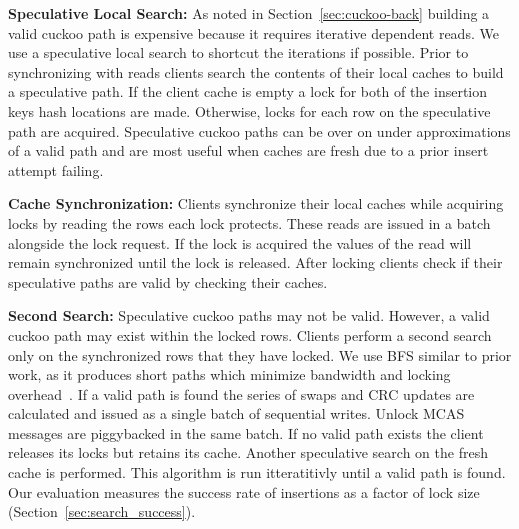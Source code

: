 \textbf{Speculative Local Search:} As noted in
Section~\ref{sec:cuckoo-back} building a valid cuckoo path
is expensive because it requires iterative dependent reads.
We use a speculative local search to shortcut the iterations
if possible. Prior to synchronizing with reads clients
search the contents of their local caches to build a
speculative path. If the client cache is empty a lock for
both of the insertion keys hash locations are made.
Otherwise, locks for each row on the speculative path are
acquired. Speculative cuckoo paths can be over on under
approximations of a valid path and are most useful when
caches are fresh due to a prior insert attempt failing.


\textbf{Cache Synchronization:} Clients synchronize their
local caches while acquiring locks by reading the rows each
lock protects. These reads are issued in a batch alongside
the lock request. If the lock is acquired the values of the
read will remain synchronized until the lock is released.
After locking clients check if their speculative paths are
valid by checking their caches.


\textbf{Second Search:} Speculative cuckoo paths may not be
valid. However, a valid cuckoo path may exist within the
locked rows. Clients perform a second search only on the
synchronized rows that they have locked. We use BFS similar
to prior work, as it produces short paths which minimize
bandwidth and locking overhead~\cite{cuckoo-improvements}.
If a valid path is found the series of swaps and CRC updates
are calculated and issued as a single batch of sequential
writes. Unlock MCAS messages are piggybacked in the same
batch.  If no valid path exists the client releases its
locks but retains its cache. Another speculative search on
the fresh cache is performed. This algorithm is run
itteratitivly until a valid path is found. Our evaluation
measures the success rate of insertions as a factor of lock
size (Section~\ref{sec:search_success}).

